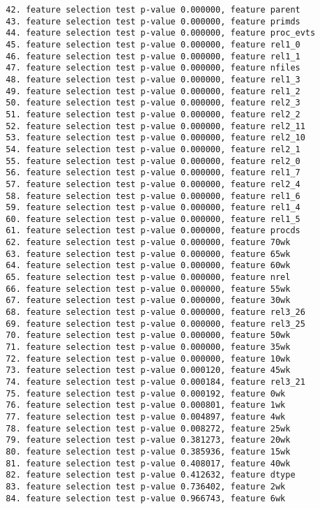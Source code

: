 \begin{verbatim}
  42. feature selection test p-value 0.000000, feature parent
  43. feature selection test p-value 0.000000, feature primds
  44. feature selection test p-value 0.000000, feature proc_evts
  45. feature selection test p-value 0.000000, feature rel1_0
  46. feature selection test p-value 0.000000, feature rel1_1
  47. feature selection test p-value 0.000000, feature nfiles
  48. feature selection test p-value 0.000000, feature rel1_3
  49. feature selection test p-value 0.000000, feature rel1_2
  50. feature selection test p-value 0.000000, feature rel2_3
  51. feature selection test p-value 0.000000, feature rel2_2
  52. feature selection test p-value 0.000000, feature rel2_11
  53. feature selection test p-value 0.000000, feature rel2_10
  54. feature selection test p-value 0.000000, feature rel2_1
  55. feature selection test p-value 0.000000, feature rel2_0
  56. feature selection test p-value 0.000000, feature rel1_7
  57. feature selection test p-value 0.000000, feature rel2_4
  58. feature selection test p-value 0.000000, feature rel1_6
  59. feature selection test p-value 0.000000, feature rel1_4
  60. feature selection test p-value 0.000000, feature rel1_5
  61. feature selection test p-value 0.000000, feature procds
  62. feature selection test p-value 0.000000, feature 70wk
  63. feature selection test p-value 0.000000, feature 65wk
  64. feature selection test p-value 0.000000, feature 60wk
  65. feature selection test p-value 0.000000, feature nrel
  66. feature selection test p-value 0.000000, feature 55wk
  67. feature selection test p-value 0.000000, feature 30wk
  68. feature selection test p-value 0.000000, feature rel3_26
  69. feature selection test p-value 0.000000, feature rel3_25
  70. feature selection test p-value 0.000000, feature 50wk
  71. feature selection test p-value 0.000000, feature 35wk
  72. feature selection test p-value 0.000000, feature 10wk
  73. feature selection test p-value 0.000120, feature 45wk
  74. feature selection test p-value 0.000184, feature rel3_21
  75. feature selection test p-value 0.000192, feature 0wk
  76. feature selection test p-value 0.000801, feature 1wk
  77. feature selection test p-value 0.004897, feature 4wk
  78. feature selection test p-value 0.008272, feature 25wk
  79. feature selection test p-value 0.381273, feature 20wk
  80. feature selection test p-value 0.385936, feature 15wk
  81. feature selection test p-value 0.408017, feature 40wk
  82. feature selection test p-value 0.412632, feature dtype
  83. feature selection test p-value 0.736402, feature 2wk
  84. feature selection test p-value 0.966743, feature 6wk

\end{verbatim}
